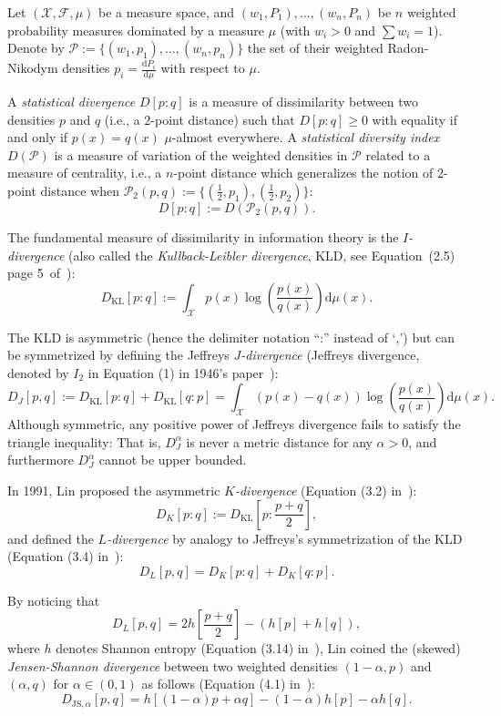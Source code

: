 \documentclass[11pt]{article}
\def\dmu{\mathrm{d}\mu}
\def\calX{\mathcal{X}}
\def\KL{\mathrm{KL}}
\def\calX{\mathcal{X}}
\def\calF{\mathcal{F}}
\def\calP{\mathcal{P}}
\def\dmu{\mathrm{d}\mu}
\def\KL{\mathrm{KL}}
\def\JS{\mathrm{JS}}
\begin{document}
Let $(\calX,\calF,\mu)$ be a measure space, and $(w_1,P_1),\ldots, (w_n,P_n)$ be $n$ weighted probability measures dominated 
by a measure $\mu$ (with $w_i>0$ and $\sum w_i=1$). 
Denote by $\calP:=\{(w_1,p_1),\ldots,  (w_n,p_n)\}$ the set of their weighted Radon-Nikodym densities $p_i=\frac{\mathrm{d}P_i}{\dmu}$ with respect to $\mu$.

A {\em statistical divergence} $D[p:q]$ is a measure of dissimilarity between two densities $p$ and $q$ (i.e., a $2$-point distance) such that $D[p:q]\geq 0$ with equality if and only if $p(x)=q(x)$ $\mu$-almost everywhere.
A {\em statistical diversity index} $D(\calP)$ is a measure of variation of the weighted densities in $\calP$ related to a measure of centrality, i.e., a $n$-point distance which generalizes the notion of $2$-point distance when $\calP_2(p,q):=\{(\frac{1}{2},p_1),(\frac{1}{2},p_2)\}$:
$$
D[p:q]:=D(\calP_2(p,q)).
$$

The fundamental measure of dissimilarity in information theory is the {\em $I$-divergence} (also called the {\em Kullback-Leibler divergence}, KLD,  see Equation~(2.5) page 5~of~\cite{Kullback-1997}):
$$
D_\KL[p:q]:=  \int_\calX p(x)\log\left(\frac{p(x)}{q(x)}\right)\dmu(x).
$$

The KLD is asymmetric (hence the delimiter notation ``:'' instead of `,') but can be symmetrized by defining the Jeffreys {\em $J$-divergence} (Jeffreys divergence, denoted by $I_2$ in Equation (1) in 1946's paper~\cite{Jeffreys-1946}):
$$
D_J[p,q] := D_\KL[p:q]+D_\KL[q:p] = \int_\calX (p(x)-q(x))\log\left(\frac{p(x)}{q(x)}\right)\dmu(x).
$$
Although symmetric, any positive power of Jeffreys divergence fails to satisfy the triangle inequality: 
That is, $D_J^\alpha$ is never a metric distance for any $\alpha>0$, and furthermore $D_J^\alpha$  cannot be upper bounded.

In 1991, Lin proposed the asymmetric {\em $K$-divergence} (Equation (3.2) in~\cite{JS-1991}):
$$
D_K[p:q]:=D_\KL\left[p:\frac{p+q}{2}\right],
$$
and defined the {\em $L$-divergence} by analogy to Jeffreys's symmetrization of the KLD (Equation (3.4) in~\cite{JS-1991}):
$$
D_L[p,q]=D_K[p:q]+D_K[q:p].
$$

By noticing that 
$$
D_L[p,q]= 2 h\left[\frac{p+q}{2}\right]-(h[p]+h[q]),
$$ 
where $h$ denotes Shannon entropy (Equation (3.14) in~\cite{JS-1991}), Lin coined the (skewed) {\em Jensen-Shannon divergence} between two weighted densities $(1-\alpha,p)$ and $(\alpha,q)$ for $\alpha\in(0,1)$ as follows (Equation (4.1) in~\cite{JS-1991}):
\begin{equation}\label{eq:JSh}
D_{\JS,\alpha}[p,q]=h[(1-\alpha)p+\alpha q]-(1-\alpha)h[p]-\alpha h[q].
\end{equation}
\end{document}
